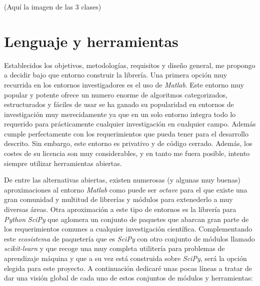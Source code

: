 \documentclass[10pt,a4paper]{report}
\begin{document}
(Aquí la imagen de las 3 clases)

\section{Lenguaje y herramientas}
Establecidos los objetivos, metodologías, requisitos y diseño general, me propongo a decidir bajo que entorno construir la librería.
Una primera opción muy recurrida en los entornos investigadores es el uso de \textit{Matlab}. Este entorno muy popular y potente ofrece un numero enorme de algoritmos categorizados, estructurados y fáciles de usar se ha ganado su popularidad en entornos de investigación muy merecidamente ya que en un solo entorno integra todo lo requerido para prácticamente cualquier investigación en cualquier campo. Además cumple perfectamente con los requerimientos que pueda tener para el desarrollo descrito. Sin embargo, este entorno es privativo y de código cerrado. Además, los costes de su licencia son muy considerables, y en tanto me fuera posible, intento siempre utilizar herramientas abiertas.

De entre las alternativas abiertas, existen numerosas (y algunas muy buenas) aproximaciones al entorno \textit{Matlab} como puede ser \textit{octave} para el que existe una gran comunidad y multitud de librerías y módulos para extenederlo a muy diversas áreas. Otra aproximación a este tipo de entornos es la librería para \textit{Python} \textit{SciPy} que aglomera un conjunto de paquetes que abarcan gran parte de los requerimientos comunes a cualquier investigación científica. Complementando este \textit{ecosistema} de paquetería que es \textit{SciPy} con otro conjunto de módulos llamado \textit{scikit-learn} y que recoge una muy completa utilitería para problemas de aprendizaje máquina y que a su vez está construida sobre \textit{SciPy}, será la opción elegida para este proyecto. A continuación dedicaré unas pocas líneas a tratar de dar una visión global de cada uno de estos conjuntos de módulos y herramientas:
\end{document}
